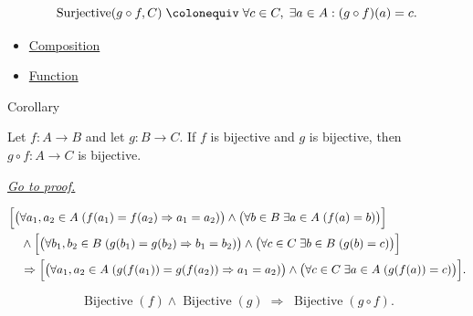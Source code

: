 \begin{remark*}
\[
  \operatorname{Surjective}(g\circ f, C)
  \;\colonequiv\;
  \forall c\in C,\;\exists a\in A: (g\circ f)(a)=c.
\]
\end{remark*}

\begin{dependencies}
\begin{itemize}
  \item \hyperref[def:composition]{Composition}
  \item \hyperref[def:function]{Function}
\end{itemize}
\end{dependencies}

\begin{corollarybox}{Corollary}
\begin{corollary}
\label{cor:composition-bijective}
Let $f:A\to B$ and let $g:B\to C$. If $f$ is bijective and $g$ is
bijective, then $g\circ f:A\to C$ is bijective.

\smallskip\noindent
\hyperref[prf:composition-bijective]{\textit{Go to proof.}}
\end{corollary}
\end{corollarybox}

\begin{remark*}
\[
\begin{aligned}
&\Bigl[
  \bigl(\forall a_1,a_2\in A\;(f(a_1)=f(a_2)\Rightarrow a_1=a_2)\bigr)
  \wedge
  \bigl(\forall b\in B\;\exists a\in A\;(f(a)=b)\bigr)
 \Bigr] \\
&\quad\wedge
 \Bigl[
  \bigl(\forall b_1,b_2\in B\;(g(b_1)=g(b_2)\Rightarrow b_1=b_2)\bigr)
  \wedge
  \bigl(\forall c\in C\;\exists b\in B\;(g(b)=c)\bigr)
 \Bigr] \\
&\quad\Rightarrow
 \Bigl[
  \bigl(\forall a_1,a_2\in A\;(g(f(a_1))=g(f(a_2))\Rightarrow a_1=a_2)\bigr)
  \wedge
  \bigl(\forall c\in C\;\exists a\in A\;(g(f(a))=c)\bigr)
 \Bigr].
\end{aligned}
\]
\end{remark*}

\begin{remark*}
\[
  \operatorname{Bijective}(f)\wedge\operatorname{Bijective}(g)
  \;\Longrightarrow\;
  \operatorname{Bijective}(g\circ f).
\]
\end{remark*}

